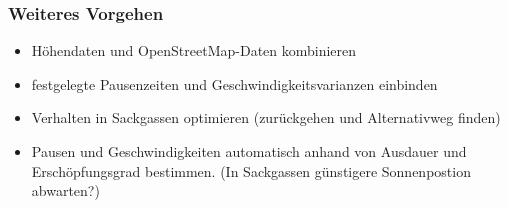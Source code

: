 \documentclass[aspectratio=43]{beamer}
\begin{document}
\begin{frame}
    \frametitle{Weiteres Vorgehen}
    \begin{itemize}
        \item Höhendaten und OpenStreetMap-Daten kombinieren
        \item festgelegte Pausenzeiten und Geschwindigkeitsvarianzen einbinden
        \item Verhalten in Sackgassen optimieren (zurückgehen und Alternativweg finden)
        \item Pausen und Geschwindigkeiten automatisch anhand von Ausdauer und
            Erschöpfungsgrad bestimmen. (In Sackgassen günstigere Sonnenpostion abwarten?)
    \end{itemize}
\end{frame}
\end{document}
